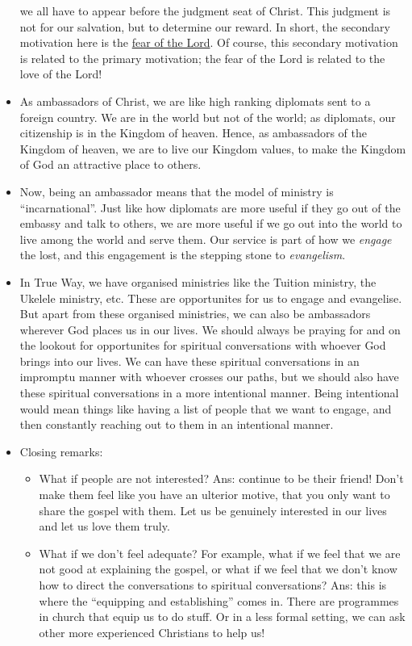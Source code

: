 \begin{itemize}
{  we all have to appear before the judgment seat of Christ.  This judgment is
  not for our salvation, but to determine our reward.  In short, the
  secondary motivation here is the \underline{fear of the Lord}.  Of course,
  this secondary motivation is related to the primary motivation; the fear of
  the Lord is related to the love of the Lord!  }
  \item{As ambassadors of Christ, we are like high ranking diplomats sent to
  a foreign country.  We are in the world but not of the world; as diplomats,
  our citizenship is in the Kingdom of heaven.  Hence, as ambassadors of the
  Kingdom of heaven, we are to live our Kingdom values, to make the Kingdom
  of God an attractive place to others.}
  \item{Now, being an ambassador means that the model of ministry is
  ``incarnational''.  Just like how diplomats are more useful if they go out
  of the embassy and talk to others, we are more useful if we go out into the
  world to live among the world and serve them.  Our service is part of how
  we \textit{engage} the lost, and this engagement is the stepping stone to
  \textit{evangelism}.}
  \item{In True Way, we have organised ministries like the Tuition ministry,
  the Ukelele ministry, etc.  These are opportunites for us to engage and
  evangelise.  But apart from these organised ministries, we can also be
  ambassadors wherever God places us in our lives.  We should always be
  praying for and on the lookout for opportunites for spiritual conversations
  with whoever God brings into our lives.  We can have these spiritual
  conversations in an impromptu manner with whoever crosses our paths, but we
  should also have these spiritual conversations in a more intentional
  manner.  Being intentional would mean things like having a list of people
  that we want to engage, and then constantly reaching out to them in an
  intentional manner.  }
  \item{Closing remarks: 
  \begin{itemize}
    \item{What if people are not interested? Ans: continue to be their friend! Don't make them feel like you have an ulterior motive, that you only want to share the gospel with them. Let us be genuinely interested in our lives and let us love them truly.}
    \item{What if we don't feel adequate? For example, what if we feel that we are not good at explaining the gospel, or what if we feel that we don't know how to direct the conversations to spiritual conversations? Ans: this is where the ``equipping and establishing'' comes in. There are programmes in church that equip us to do stuff. Or in a less formal setting, we can ask other more experienced Christians to help us!}

\end{itemize}}
\end{itemize}
